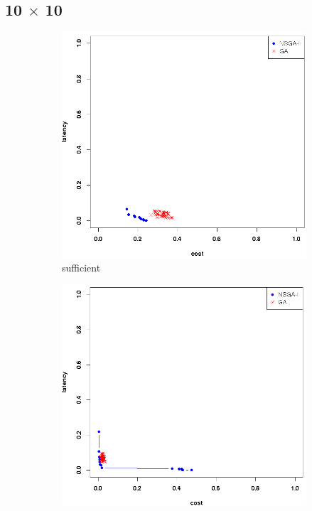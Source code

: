 \documentclass{llncs}
\begin{document}
\subsection{10 $\times$ 10}
\begin{figure}[H]
	\centering
	\begin{subfigure}[b]{0.3\textwidth}
		\includegraphics[width=\textwidth]{pics/pop_50_gen_50_10_times_10_suff.png}
		\caption{sufficient}
	\end{subfigure}%
	\begin{subfigure}[b]{0.3\textwidth}
		\includegraphics[width=\textwidth]{pics/pop_50_gen_50_10_times_10_minimum.png}

\end{subfigure}
\end{figure}
\end{document}
